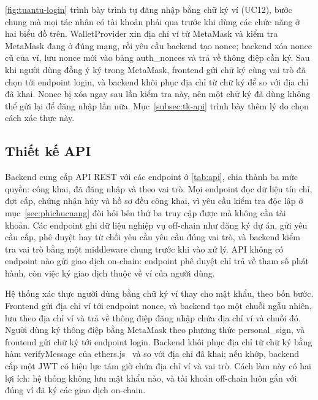 \HinhTuanTuRetire

\autoref{fig:tuantu-login} trình bày trình tự đăng nhập bằng chữ ký ví (UC12), bước chung mà mọi tác nhân có tài khoản phải qua trước khi dùng các chức năng ở hai biểu đồ trên. WalletProvider xin địa chỉ ví từ MetaMask và kiểm tra MetaMask đang ở đúng mạng, rồi yêu cầu backend tạo nonce; backend xóa nonce cũ của ví, lưu nonce mới vào bảng auth\_nonces và trả về thông điệp cần ký. Sau khi người dùng đồng ý ký trong MetaMask, frontend gửi chữ ký cùng vai trò đã chọn tới endpoint login, và backend khôi phục địa chỉ từ chữ ký để so với địa chỉ đã khai. Nonce bị xóa ngay sau lần kiểm tra này, nên một chữ ký đã dùng không thể gửi lại để đăng nhập lần nữa. Mục~\ref{subsec:tk-api} trình bày thêm lý do chọn cách xác thực này.

\HinhTuanTuLogin

\FloatBarrier
\subsection*{Thiết kế API}
\label{subsec:tk-api}

Backend cung cấp API REST với các endpoint ở \autoref{tab:api}, chia thành ba mức quyền: công khai, đã đăng nhập và theo vai trò. Mọi endpoint đọc dữ liệu tín chỉ, đợt cấp, chứng nhận hủy và hồ sơ đều công khai, vì yêu cầu kiểm tra độc lập ở mục~\ref{sec:phichucnang} đòi hỏi bên thứ ba truy cập được mà không cần tài khoản. Các endpoint ghi dữ liệu nghiệp vụ off-chain như đăng ký dự án, gửi yêu cầu cấp, phê duyệt hay từ chối yêu cầu yêu cầu đúng vai trò, và backend kiểm tra vai trò bằng một middleware chung trước khi vào xử lý. API không có endpoint nào gửi giao dịch on-chain: endpoint phê duyệt chỉ trả về tham số phát hành, còn việc ký giao dịch thuộc về ví của người dùng.

\BangAPI

Hệ thống xác thực người dùng bằng chữ ký ví thay cho mật khẩu, theo bốn bước. Frontend gửi địa chỉ ví tới endpoint nonce, và backend tạo một chuỗi ngẫu nhiên, lưu theo địa chỉ ví và trả về thông điệp đăng nhập chứa địa chỉ ví và chuỗi đó. Người dùng ký thông điệp bằng MetaMask theo phương thức personal\_sign, và frontend gửi chữ ký tới endpoint login. Backend khôi phục địa chỉ từ chữ ký bằng hàm verifyMessage của ethers.js~\cite{ethers2024docs} và so với địa chỉ đã khai; nếu khớp, backend cấp một JWT có hiệu lực tám giờ chứa địa chỉ ví và vai trò. Cách làm này có hai lợi ích: hệ thống không lưu mật khẩu nào, và tài khoản off-chain luôn gắn với đúng ví đã ký các giao dịch on-chain.

